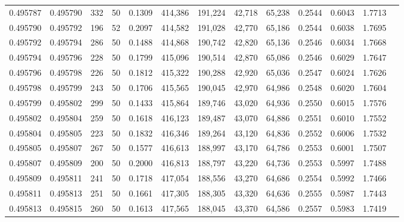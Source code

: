 \begin{tabular}{rrrrrrrrrrrrr}
0.495787 & 0.495790 &   332 &  50 &                                     0.1309 & 414,386 & 191,224 &  42,718 &  65,238 & 0.2544 & 0.6043 & 1.7713 \\
0.495790 & 0.495792 &   196 &  52 &                                     0.2097 & 414,582 & 191,028 &  42,770 &  65,186 & 0.2544 & 0.6038 & 1.7695 \\
0.495792 & 0.495794 &   286 &  50 &                                     0.1488 & 414,868 & 190,742 &  42,820 &  65,136 & 0.2546 & 0.6034 & 1.7668 \\
0.495794 & 0.495796 &   228 &  50 &                                     0.1799 & 415,096 & 190,514 &  42,870 &  65,086 & 0.2546 & 0.6029 & 1.7647 \\
0.495796 & 0.495798 &   226 &  50 &                                     0.1812 & 415,322 & 190,288 &  42,920 &  65,036 & 0.2547 & 0.6024 & 1.7626 \\
0.495798 & 0.495799 &   243 &  50 &                                     0.1706 & 415,565 & 190,045 &  42,970 &  64,986 & 0.2548 & 0.6020 & 1.7604 \\
0.495799 & 0.495802 &   299 &  50 &                                     0.1433 & 415,864 & 189,746 &  43,020 &  64,936 & 0.2550 & 0.6015 & 1.7576 \\
0.495802 & 0.495804 &   259 &  50 &                                     0.1618 & 416,123 & 189,487 &  43,070 &  64,886 & 0.2551 & 0.6010 & 1.7552 \\
0.495804 & 0.495805 &   223 &  50 &                                     0.1832 & 416,346 & 189,264 &  43,120 &  64,836 & 0.2552 & 0.6006 & 1.7532 \\
0.495805 & 0.495807 &   267 &  50 &                                     0.1577 & 416,613 & 188,997 &  43,170 &  64,786 & 0.2553 & 0.6001 & 1.7507 \\
0.495807 & 0.495809 &   200 &  50 &                                     0.2000 & 416,813 & 188,797 &  43,220 &  64,736 & 0.2553 & 0.5997 & 1.7488 \\
0.495809 & 0.495811 &   241 &  50 &                                     0.1718 & 417,054 & 188,556 &  43,270 &  64,686 & 0.2554 & 0.5992 & 1.7466 \\
0.495811 & 0.495813 &   251 &  50 &                                     0.1661 & 417,305 & 188,305 &  43,320 &  64,636 & 0.2555 & 0.5987 & 1.7443 \\
0.495813 & 0.495815 &   260 &  50 &                                     0.1613 & 417,565 & 188,045 &  43,370 &  64,586 & 0.2557 & 0.5983 & 1.7419 \\

\end{tabular}
